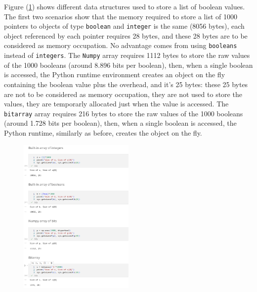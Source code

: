 \documentclass{beamer}
\begin{document}
\begin{frame}{}
    Figure (\ref{fig:mem_array}) shows different data structures used to store a list of boolean values.
    The first two scenarios show that the memory required to store a list of
    1000 pointers to objects of type \texttt{boolean} and \texttt{integer} is 
    the same (8056 bytes), each object referenced by each pointer requires 28 bytes,
    and these 28 bytes are to be considered as memory occupation.
    No advantage comes from using \texttt{booleans} instead of \texttt{integers}.
    The \texttt{Numpy} array requires 1112 bytes to store the raw values of 
    the 1000 booleans (around 8.896 bits per boolean), then, when a single boolean
    is accessed, the Python runtime environment creates an object on the 
    fly containing the
    boolean value plus the overhead, and it's 25 bytes: these 25 bytes are not
    to be considered as memory occupation, they are not used to store
    the values, they are temporarly allocated just when the value is accessed.
    The \texttt{bitarray} array requires 216 bytes to store the raw values of
    the 1000 booleans (around 1.728 bits per boolean), then, when a single boolean
    is accessed, the Python runtime, similarly as before, creates the object on the fly.
\end{frame}

\begin{frame}
        \begin{figure}
            \centering
            \includegraphics[width=0.5\textwidth]{mem_array.png}
            \label{fig:mem_array}
        \end{figure}
\end{frame}
\end{document}

